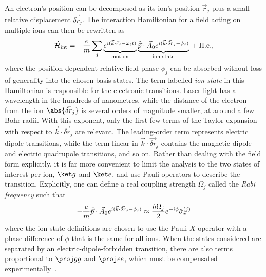 An electron's position can be decomposed as its ion's position $\vec r_j$ plus a small relative displacement $\vec{\delta r}_j$.
The interaction Hamiltonian for a field acting on multiple ions can then be rewritten as
\begin{equation}\label{eq:iontrap-field-interaction-hamiltonian}
\hat{\mathcal H}_{\text{int}} = -\frac em\sum_j 
    \underbrace{e^{i(\vec k\cdot \vec r_j - \omega_\ell t)}\vphantom{\vec p}}_{\text{motion}}
    \underbrace{\hat{\vec p}\cdot \vec A_0 e^{i(\vec k\cdot \vec{\delta r}_j - \phi_j)}}_{\text{ion state}}
{} + \text{H.c.},
\end{equation}
where the position-dependent relative field phase $\phi_j$ can be absorbed without loss of generality into the chosen basis states.
The term labelled \emph{ion state} in this Hamiltonian is responsible for the electronic transitions.
Laser light has a wavelength in the hundreds of nanometres, while the distance of the electron from the ion $\abs{\vec{\delta r}_j}$ is several orders of magnitude smaller, at around a few Bohr radii.
With this exponent, only the first few terms of the Taylor expansion with respect to $\vec k\cdot \vec{\delta r}_j$ are relevant.
The leading-order term represents electric dipole transitions, while the term linear in $\vec k\cdot \vec{\delta r}_j$ contains the magnetic dipole and electric quadrupole transitions, and so on.
Rather than dealing with the field form explicitly, it is far more convenient to limit the analysis to the two states of interest per ion, $\ket g$ and $\ket e$, and use Pauli operators to describe the transition.
Explicitly, one can define a real coupling strength $\Omega_j$ called the \emph{Rabi frequency} such that
\begin{equation}
-\frac em \hat{\vec p}\cdot \vec A_0 e^{i(\vec k\cdot \vec{\delta r}_j - \phi_j)}
\approx \frac{\hbar\Omega_j}{2} e^{-i\phi} \hat{\sigma}_{\mkern-1mu x}^{(j)}
\end{equation}
where the ion state definitions are chosen to use the Pauli $X$ operator with a phase difference of $\phi$ that is the same for all ions.
When the states considered are separated by an electric-dipole-forbidden transition, there are also terms proportional to $\proj gg$ and $\proj ee$, which must be compensated experimentally~\cite{Haffner2003}.

